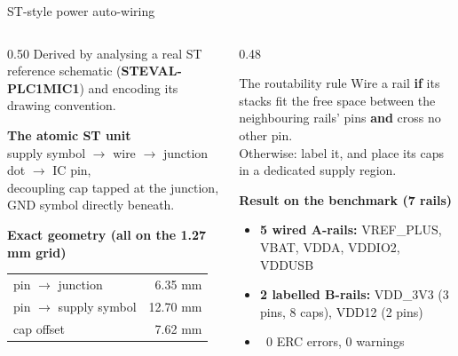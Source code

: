 \documentclass[aspectratio=169,10pt]{beamer}
\newcommand{\ok}{{\color{stgreen}\textbf{\checkmark}}}
\begin{document}
\begin{frame}{ST-style power auto-wiring}
\vspace{1mm}
\begin{columns}[T]
\begin{column}{0.50\textwidth}
\small
Derived by analysing a real ST reference schematic (\textbf{STEVAL-PLC1MIC1}) and encoding its drawing convention.
\vspace{2mm}

\textbf{The atomic ST unit}\\
supply symbol $\rightarrow$ wire $\rightarrow$ junction dot $\rightarrow$ IC pin,\\
decoupling cap tapped at the junction,\\
GND symbol directly beneath.
\vspace{2mm}

\textbf{Exact geometry (all on the 1.27\,mm grid)}
\begin{center}\footnotesize
\begin{tabular}{@{}lr@{}}
\toprule
pin $\rightarrow$ junction & 6.35 mm\\
pin $\rightarrow$ supply symbol & 12.70 mm\\
cap offset & 7.62 mm\\
\bottomrule
\end{tabular}
\end{center}
\end{column}
\begin{column}{0.48\textwidth}
\begin{block}{The routability rule}
\small
Wire a rail \textbf{if} its stacks fit the free space between the neighbouring rails' pins \textbf{and} cross no other pin.\\[3pt]
Otherwise: label it, and place its caps in a dedicated supply region.
\end{block}
\vspace{2mm}
\textbf{Result on the benchmark (7 rails)}
\begin{itemize}\small
  \item \textbf{5 wired A-rails:} VREF\_PLUS, VBAT, VDDA, VDDIO2, VDDUSB
  \item \textbf{2 labelled B-rails:} VDD\_3V3 (3 pins, 8 caps), VDD12 (2 pins)
  \item \ok\ 0 ERC errors, 0 warnings
\end{itemize}
\end{column}
\end{columns}
\end{frame}
\end{document}
